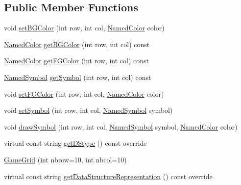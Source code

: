 \subsection*{Public Member Functions}
\begin{DoxyCompactItemize}
\item 
void \hyperlink{classbridges_1_1game_1_1_game_grid_a141dbed75aeb34498ee0f8ad17c2cb6c}{set\+B\+G\+Color} (int row, int col, \hyperlink{namespacebridges_1_1game_afaa832a4322b25b6a4ebfba832f10f26}{Named\+Color} color)
\item 
\hyperlink{namespacebridges_1_1game_afaa832a4322b25b6a4ebfba832f10f26}{Named\+Color} \hyperlink{classbridges_1_1game_1_1_game_grid_ae63280e78a80eb0fe72050afa8ef2a63}{get\+B\+G\+Color} (int row, int col) const
\item 
\hyperlink{namespacebridges_1_1game_afaa832a4322b25b6a4ebfba832f10f26}{Named\+Color} \hyperlink{classbridges_1_1game_1_1_game_grid_a6d38c8ac0d4ccbdd1b2b1c5d2f445d9a}{get\+F\+G\+Color} (int row, int col) const
\item 
\hyperlink{namespacebridges_1_1game_ab9a19c7ab6e2ebac2f95180e21733487}{Named\+Symbol} \hyperlink{classbridges_1_1game_1_1_game_grid_aac18709133e1e2e6e77708779cabc553}{get\+Symbol} (int row, int col) const
\item 
void \hyperlink{classbridges_1_1game_1_1_game_grid_add272657d570437edc849eb7cfd061fb}{set\+F\+G\+Color} (int row, int col, \hyperlink{namespacebridges_1_1game_afaa832a4322b25b6a4ebfba832f10f26}{Named\+Color} color)
\item 
void \hyperlink{classbridges_1_1game_1_1_game_grid_aaca03d00599251edb5312e9ba51dd62e}{set\+Symbol} (int row, int col, \hyperlink{namespacebridges_1_1game_ab9a19c7ab6e2ebac2f95180e21733487}{Named\+Symbol} symbol)
\item 
void \hyperlink{classbridges_1_1game_1_1_game_grid_a32c5c19c1dff8d50001d2aa57cbda70b}{draw\+Symbol} (int row, int col, \hyperlink{namespacebridges_1_1game_ab9a19c7ab6e2ebac2f95180e21733487}{Named\+Symbol} symbol, \hyperlink{namespacebridges_1_1game_afaa832a4322b25b6a4ebfba832f10f26}{Named\+Color} color)
\item 
virtual const string \hyperlink{classbridges_1_1game_1_1_game_grid_a07da19700a077e3d0f2cde2cade2ba60}{get\+D\+Stype} () const override
\item 
\hyperlink{classbridges_1_1game_1_1_game_grid_a00d0b39cd640fe338a96961ca1793191}{Game\+Grid} (int nbrow=10, int nbcol=10)
\item 
virtual const string \hyperlink{classbridges_1_1game_1_1_game_grid_aefbf4969375a174cefd8e2edf9fb6900}{get\+Data\+Structure\+Representation} () const override
\end{DoxyCompactItemize}
